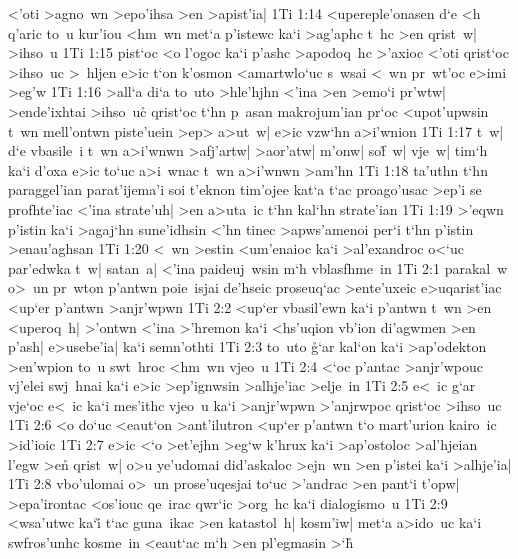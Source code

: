 <'oti
>agno~wn
>epo'ihsa
>en
>apist'ia|\bibvsend
\vs 1Ti 1:14
<upereple'onasen
d`e
<h
q'aric
to~u
kur'iou
<hm~wn
met`a
p'istewc
ka`i
>ag'aphc
t~hc
>en
qrist~w|
>ihso~u\bibvsend
\vs 1Ti 1:15
pist`oc
<o
l'ogoc
ka`i
p'ashc
>apodoq~hc
>'axioc
<'oti
qrist`oc
>ihso~uc
>~hljen
e>ic
t`on
k'osmon
<amartwlo`uc
s~wsai
<~wn
pr~wt'oc
e>imi
>eg'w\bibvsend
\vs 1Ti 1:16
>all`a
di`a
to~uto
>hle'hjhn
<'ina
>en
>emo`i
pr'wtw|
>ende'ixhtai
>ihso~uc\r{}
qrist`oc
t`hn
p~asan
makrojum'ian
pr`oc
<upot'upwsin
t~wn
mell'ontwn
piste'uein
>ep>
a>ut~w|
e>ic
vzw`hn
a>i'wnion\bibvsend
\vs 1Ti 1:17
t~w|
d`e
vbasile~i
t~wn
a>i'wnwn
>afj'artw|
>aor'atw|
m'onw|
so\r{f}~w|
vje~w|
tim`h
ka`i
d'oxa
e>ic
to`uc
a>i~wnac
t~wn
a>i'wnwn
>am'hn\bibvsend
\vs 1Ti 1:18
ta'uthn
t`hn
paraggel'ian
parat'ijema'i
soi
t'eknon
tim'ojee
kat`a
t`ac
proago'usac
>ep'i
se
profhte'iac
<'ina
strate'uh|
>en
a>uta~ic
t`hn
kal`hn
strate'ian\bibvsend
\vs 1Ti 1:19
>'eqwn
p'istin
ka`i
>agaj`hn
sune'idhsin
<'hn
tinec
>apws'amenoi
per`i
t`hn
p'istin
>enau'aghsan\bibvsend
\vs 1Ti 1:20
<~wn
>estin
<um'enaioc
ka`i
>al'exandroc
o<`uc
par'edwka
t~w|
satan~a|
<'ina
paideuj~wsin
m`h
vblasfhme~in\bibvsend
\vs 1Ti 2:1
parakal~w
o>~un
pr~wton
p'antwn
poie~isjai
de'hseic
proseuq`ac
>ente'uxeic
e>uqarist'iac
<up`er
p'antwn
>anjr'wpwn\bibvsend
\vs 1Ti 2:2
<up`er
vbasil'ewn
ka`i
p'antwn
t~wn
>en
<uperoq~h|
>'ontwn
<'ina
>'hremon
ka`i
<hs'uqion
vb'ion
di'agwmen
>en
p'ash|
e>usebe'ia|
ka`i
semn'othti\bibvsend
\vs 1Ti 2:3
to~uto
\r{g}`ar
kal`on
ka`i
>ap'odekton
>en'wpion
to~u
swt~hroc
<hm~wn
vjeo~u\bibvsend
\vs 1Ti 2:4
<`oc
p'antac
>anjr'wpouc
vj'elei
swj~hnai
ka`i
e>ic
>ep'ignwsin
>alhje'iac
>elje~in\bibvsend
\vs 1Ti 2:5
e<~ic
g`ar
vje`oc
e<~ic
ka`i
mes'ithc
vjeo~u
ka`i
>anjr'wpwn
>'anjrwpoc
qrist`oc
>ihso~uc\bibvsend
\vs 1Ti 2:6
<o
do`uc
<eaut`on
>ant'ilutron
<up`er
p'antwn
t`o
mart'urion
kairo~ic
>id'ioic\bibvsend
\vs 1Ti 2:7
e>ic
<`o
>et'ejhn
>eg`w
k'hrux
ka`i
>ap'ostoloc
>al'hjeian
l'egw
>en\r{}
qrist~w|
o>u
ye'udomai
did'askaloc
>ejn~wn
>en
p'istei
ka`i
>alhje'ia|\bibvsend
\vs 1Ti 2:8
vbo'ulomai
o>~un
prose'uqesjai
to`uc
>'andrac
>en
pant`i
t'opw|
>epa'irontac
<os'iouc
qe~irac
qwr`ic
>org~hc
ka`i
dialogismo~u\bibvsend
\vs 1Ti 2:9
<wsa'utwc
ka`i\r{}
t`ac
guna~ikac
>en
katastol~h|
kosm'iw|
met`a
a>ido~uc
ka`i
swfros'unhc
kosme~in
<eaut`ac
m`h
>en
pl'egmasin
>`h\r{}

